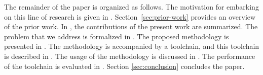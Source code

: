 The remainder of the paper is organized as follows. The motivation for embarking
on this line of research is given in .
Section~\ref{sec:prior-work} provides an overview of the prior work. In
, the contributions of the present work are summarized. The
problem that we address is formalized in . The
proposed methodology is presented in . The methodology is
accompanied by a toolchain, and this toolchain is described in .
The usage of the methodology is discussed in . The
performance of the toolchain is evaluated in .
Section \ref{sec:conclusion} concludes the paper.
